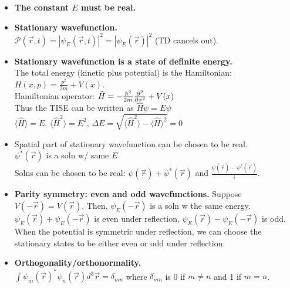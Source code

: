 \begin{itemize}[noitemsep,wide=0pt, leftmargin=\dimexpr{} + 2\relax]

    \item \textbf{The constant $E$ must be real.}
    
    \item \textbf{Stationary wavefunction.} \\
        $\mathcal{P}(\vec{r}, t) = |\psi_E(\vec{r}, t)|^2 = |\psi_E(\vec{r})|^2$ (TD cancels out).

    \item \textbf{Stationary wavefunction is a state of definite energy.} \\
        The total energy (kinetic plus potential) is the Hamiltonian: $H(x, p) = \frac{p^2}{2m} + V(x)$. \\

        Hamiltonian operator: $\widehat{H} = -\frac{\hbar^2}{2m} \pdv[2]{}{x} + V(x)$ \\
        Thus the TISE can be written as $\widehat{H} \psi = E \psi$ \\

        $\langle \widehat{H} \rangle = E$, $\langle \widehat{H} ^2 \rangle = E^2$, $\Delta E = \sqrt{\langle \widehat{H}^2 \rangle - \langle \widehat{H} \rangle ^2} = 0$

    \item Spatial part of stationary wavefunction can be chosen to be real. \\
        $\psi^*(\vec{r})$ is a soln w/ same $E$ \\
        Solns can be chosen to be real: $\psi(\vec{r}) + \psi^*(\vec{r})$ and $\frac{\psi(\vec{r}) - \psi^*(\vec{r})}{i}$.

    \item \textbf{Parity symmetry: even and odd wavefunctions.}
        Suppose $V(-\vec{r}) = V(\vec{r})$. Then, $\psi_E(-\vec{r})$ is a soln w the same energy. \\
        $\psi_E(\vec{r}) + \psi_E(-\vec{r})$ is even under reflection, $\psi_E(\vec{r}) - \psi_E(-\vec{r})$ is odd. \\
        When the potential is symmetric under reflection, we can choose the stationary states to be either even or odd under reflection.

    \item \textbf{Orthogonality/orthonormality.} \\
        $\int \psi_m (\vec{r})^* \psi_n (\vec{r}) d^3 \vec{r} = \delta_{mn}$ where $\delta_{mn}$ is 0 if $m \neq n$ and 1 if $m = n$.


\end{itemize}
